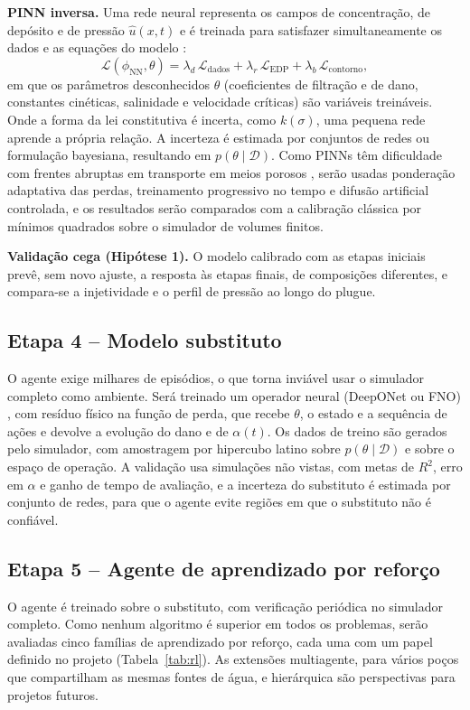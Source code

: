 \documentclass[10pt,a4paper]{article}
\begin{document}
\textbf{PINN inversa.} Uma rede neural representa os campos de concentração, de depósito e
de pressão $\hat{u}(x,t)$ e é treinada para satisfazer simultaneamente os dados e as
equações do modelo \cite{raissi2019}:
\begin{equation}
\mathcal{L}(\phi_{\mathrm{NN}},\theta) =
\lambda_d\,\mathcal{L}_{\mathrm{dados}} + \lambda_r\,\mathcal{L}_{\mathrm{EDP}} + \lambda_b\,\mathcal{L}_{\mathrm{contorno}},
\end{equation}
em que os parâmetros desconhecidos $\theta$ (coeficientes de filtração e de dano,
constantes cinéticas, salinidade e velocidade críticas) são variáveis treináveis. Onde a
forma da lei constitutiva é incerta, como $k(\sigma)$, uma pequena rede aprende a própria
relação. A incerteza é estimada por conjuntos de redes ou formulação bayesiana, resultando
em $p(\theta\mid\mathcal{D})$. Como PINNs têm dificuldade com frentes abruptas em
transporte em meios porosos \cite{fuks2020}, serão usadas ponderação adaptativa das
perdas, treinamento progressivo no tempo e difusão artificial controlada, e os resultados
serão comparados com a calibração clássica por mínimos quadrados sobre o simulador de
volumes finitos.

\textbf{Validação cega (Hipótese 1).} O modelo calibrado com as etapas iniciais prevê, sem novo
ajuste, a resposta às etapas finais, de composições diferentes, e compara-se a injetividade
e o perfil de pressão ao longo do plugue.

\subsection{Etapa 4 -- Modelo substituto}
O agente exige milhares de episódios, o que torna inviável usar o simulador completo como
ambiente. Será treinado um operador neural (DeepONet ou FNO) \cite{lu2021deeponet,li2021fno},
com resíduo físico na função de perda, que recebe $\theta$, o estado e a sequência de
ações e devolve a evolução do dano e de $\alpha(t)$. Os dados de treino são gerados pelo
simulador, com amostragem por hipercubo latino sobre $p(\theta\mid\mathcal{D})$ e sobre o
espaço de operação. A validação usa simulações não vistas, com metas de $R^2$, erro em
$\alpha$ e ganho de tempo de avaliação, e a incerteza do substituto é estimada por
conjunto de redes, para que o agente evite regiões em que o substituto não é confiável.

\subsection{Etapa 5 -- Agente de aprendizado por reforço}
O agente é treinado sobre o substituto, com verificação periódica no simulador completo.
Como nenhum algoritmo é superior em todos os problemas, serão avaliadas cinco famílias de
aprendizado por reforço, cada uma com um papel definido no projeto
(Tabela~\ref{tab:rl}). As extensões multiagente, para vários poços que compartilham as mesmas
fontes de água, e hierárquica são perspectivas para projetos futuros.
\end{document}
